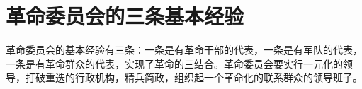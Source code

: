 \section{革命委员会的三条基本经验}

革命委员会的基本经验有三条：一条是有革命干部的代表，一条是有军队的代表，一条是有革命群众的代表，实现了革命的三结合。革命委员会要实行一元化的领导，打破重迭的行政机构，精兵简政，组织起一个革命化的联系群众的领导班子。

